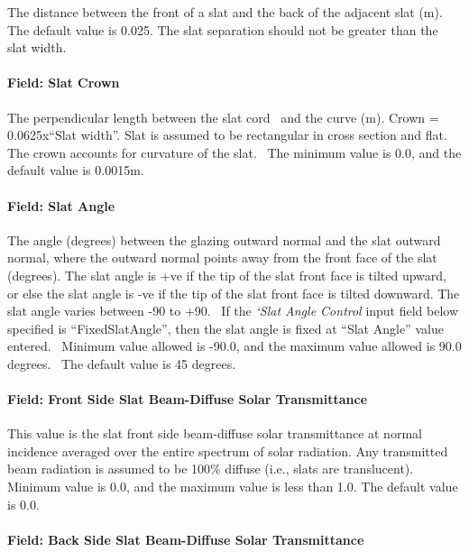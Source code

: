 The distance between the front of a slat and the back of the adjacent slat (m). The default value is 0.025. The slat separation should not be greater than the slat width.

\paragraph{Field: Slat Crown}\label{field-slat-crown}

The perpendicular length between the slat cord ~and the curve (m). Crown = 0.0625x``Slat width''. Slat is assumed to be rectangular in cross section and flat. The crown accounts for curvature of the slat.~ The minimum value is 0.0, and the default value is 0.0015m.

\paragraph{Field: Slat Angle}\label{field-slat-angle-2}

The angle (degrees) between the glazing outward normal and the slat outward normal, where the outward normal points away from the front face of the slat (degrees). The slat angle is +ve if the tip of the slat front face is tilted upward, or else the slat angle is -ve if the tip of the slat front face is tilted downward. The slat angle varies between -90 to +90.~ If the \textit{`Slat Angle Control} input field below specified is ``FixedSlatAngle'', then the slat angle is fixed at ``Slat Angle'' value entered.~ Minimum value allowed is -90.0, and the maximum value allowed is 90.0 degrees.~ The default value is 45 degrees.

\paragraph{Field: Front Side Slat Beam-Diffuse Solar Transmittance}\label{field-front-side-slat-beam-diffuse-solar-transmittance}

This value is the slat front side beam-diffuse solar transmittance at normal incidence averaged over the entire spectrum of solar radiation. Any transmitted beam radiation is assumed to be 100\% diffuse (i.e., slats are translucent). Minimum value is 0.0, and the maximum value is less than 1.0. The default value is 0.0.

\paragraph{Field: Back Side Slat Beam-Diffuse Solar Transmittance}\label{field-back-side-slat-beam-diffuse-solar-transmittance}

